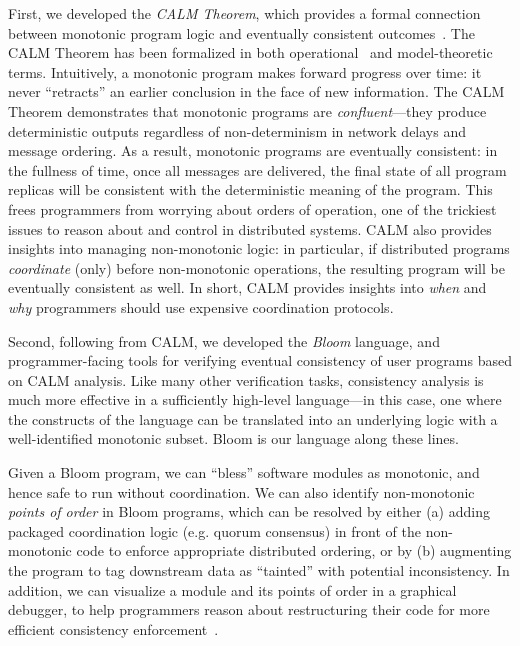 First, we developed the \emph{CALM Theorem}, which provides a formal connection
between monotonic program logic and eventually consistent outcomes~\cite{podskey}.  The CALM Theorem has been formalized in both operational~\cite{Ameloot2011,Abiteboul2011} and model-theoretic~\cite{marczak2012} terms.    Intuitively, a monotonic program makes forward progress over time: it never ``retracts'' an earlier conclusion in the face of new information.   The CALM Theorem demonstrates that monotonic programs are \emph{confluent}---they produce deterministic outputs regardless of non-determinism in network delays and message ordering.  As a result, monotonic programs are eventually consistent: in the fullness of time, once all messages are delivered, the final state of all program replicas will be consistent with the deterministic meaning of the program.  This frees programmers from worrying about orders of operation, one of the trickiest issues to reason about and control in distributed systems.  CALM also provides insights into managing non-monotonic logic: in particular, if distributed programs \emph{coordinate} (only) before non-monotonic operations, the resulting program will be eventually consistent as well.  In short, CALM provides insights into \emph{when} and \emph{why} programmers should use expensive coordination protocols.

Second, following from CALM, we developed the \emph{Bloom} language, and programmer-facing tools for verifying eventual consistency of user programs based on CALM analysis. Like many other verification tasks, consistency analysis is much more effective in a sufficiently high-level language---in this case, one where the constructs of the language can be translated into an underlying logic with a well-identified monotonic subset. Bloom is our language along these lines. 

Given a Bloom program, we can ``bless'' software modules as monotonic, and hence safe to run without coordination.  We can also identify non-monotonic \emph{points of order} in Bloom programs, which can be resolved by either (a) adding packaged coordination logic (e.g. quorum consensus) in front of the non-monotonic code to enforce appropriate distributed ordering, or by (b) augmenting the program to tag downstream data as ``tainted'' with potential inconsistency.  In addition, we can visualize a module and its points of order in a graphical debugger, to help programmers reason about restructuring their code for more efficient consistency enforcement~\cite{Alvaro2011}.

